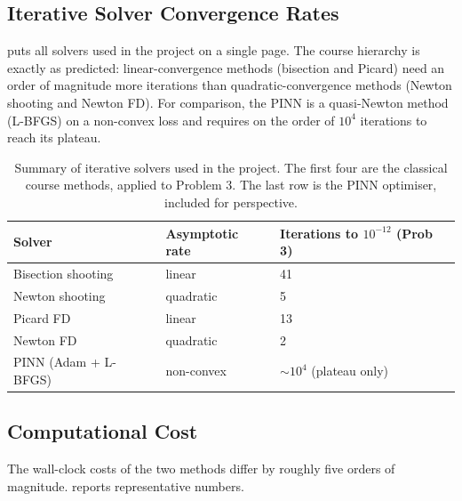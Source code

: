 \documentclass[11pt]{article}
\theoremstyle{plain}
\theoremstyle{remark}
\begin{document}
\subsection{Iterative Solver Convergence Rates}
\label{sec:iter_conv}

 puts all solvers used in the project on a single
page. The course hierarchy is exactly as predicted: linear-convergence
methods (bisection and Picard) need an order of magnitude more iterations
than quadratic-convergence methods (Newton shooting and Newton FD).
For comparison, the PINN is a quasi-Newton method (L-BFGS) on a
non-convex loss and requires on the order of $10^4$ iterations to
reach its plateau.

\begin{table}[h]
\centering
\begin{tabular}{lll}
\toprule
\textbf{Solver} & \textbf{Asymptotic rate} & \textbf{Iterations to $10^{-12}$ (Prob 3)} \\
\midrule
Bisection shooting   & linear     & 41 \\
Newton shooting      & quadratic  & 5 \\
Picard FD            & linear     & 13 \\
Newton FD            & quadratic  & 2 \\
PINN (Adam + L-BFGS) & non-convex & $\sim 10^{4}$ (plateau only) \\
\bottomrule
\end{tabular}
\caption{Summary of iterative solvers used in the project. The first
         four are the classical course methods, applied to Problem 3.
         The last row is the PINN optimiser, included for perspective.}
\label{tab:iter_summary}
\end{table}


\subsection{Computational Cost}
\label{sec:cost}

The wall-clock costs of the two methods differ by roughly five orders
of magnitude.  reports representative numbers.
\end{document}
